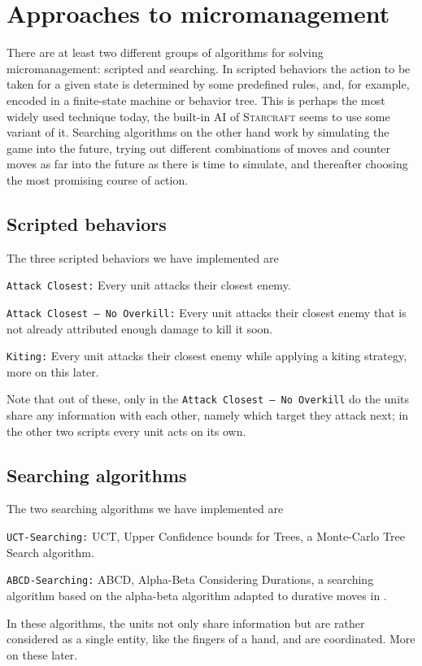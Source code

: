 \section{Approaches to micromanagement}
There are at least two different groups of algorithms for solving micromanagement: scripted and searching.
In scripted behaviors the action to be taken for a given state is determined by some predefined rules, and, for example, encoded in a finite-state machine or behavior tree.
This is perhaps the most widely used technique today, the built-in AI of \textsc{Starcraft} seems to use some variant of it.
Searching algorithms on the other hand work by simulating the game into the future, trying out different combinations of moves and counter moves as far into the future as there is time to simulate, and thereafter choosing the most promising course of action.

\subsection{Scripted behaviors}
The three scripted behaviors we have implemented are
\begin{shortitem}
\item \texttt{Attack Closest:}					Every unit attacks their closest enemy.
\item \texttt{Attack Closest -- No Overkill:}	Every unit attacks their closest enemy that is not already attributed enough damage to kill it soon.
\item \texttt{Kiting:}							Every unit attacks their closest enemy while applying a kiting strategy, more on this later.
\end{shortitem}

Note that out of these, only in the \texttt{Attack Closest -- No Overkill} do the units share any information with each other, namely which target they attack next; in the other two scripts every unit acts on its own.

\subsection {Searching algorithms}
The two searching algorithms we have implemented are
\begin{shortitem}
\item \texttt{UCT-Searching:}	UCT, Upper Confidence bounds for Trees, a Monte-Carlo Tree Search algorithm.
\item \texttt{ABCD-Searching:}	ABCD, Alpha-Beta Considering Durations, a searching algorithm based on the alpha-beta algorithm adapted to durative moves in \cite{abcd}.
\end{shortitem}
In these algorithms, the units not only share information but are rather considered as a single entity, like the fingers of a hand, and are coordinated.
More on these later.
